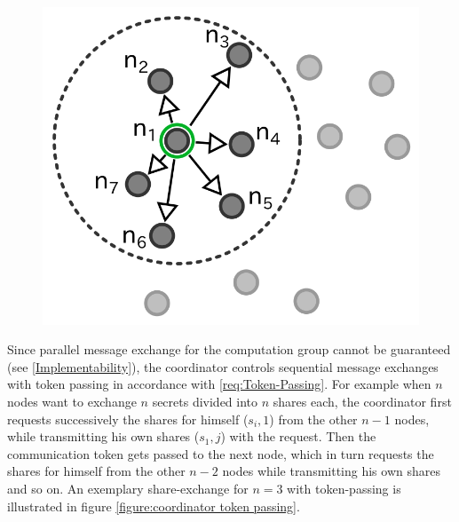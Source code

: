 \begin{figure}[!htb]
{				\includegraphics[scale=1.0]{figures/coordinator-5.png}
				\label{figure:Formation of fully meshed computation group - e}
			}%
			\hfill
		\end{figure}
		
		Since parallel message exchange for the computation group cannot be guaranteed (see \ref{Implementability}), the coordinator controls sequential message exchanges with token passing in accordance with \ref{req:Token-Passing}. For example when $n$ nodes want to exchange $n$ secrets divided into $n$ shares each, the coordinator first requests successively the shares for himself ($s_i,1$) from the other $n-1$ nodes, while transmitting his own shares ($s_1,j$) with the request. Then the communication token gets passed to the next node, which in turn requests the shares for himself from the other $n-2$ nodes while transmitting his own shares and so on. An exemplary share-exchange for $n=3$ with token-passing is illustrated in figure \ref{figure:coordinator token passing}.
		
